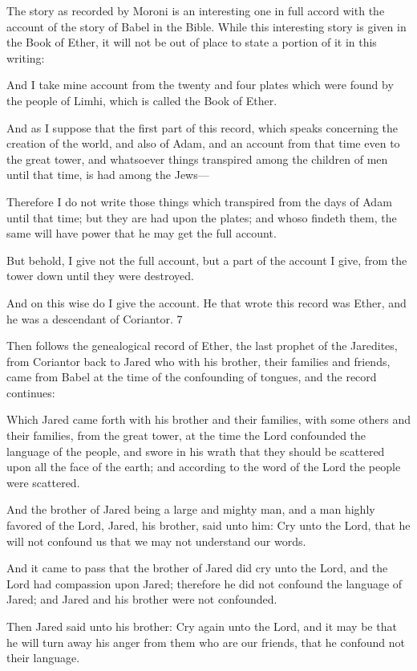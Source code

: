 The story as recorded by Moroni is an interesting one in full accord with the account of the
story of Babel in the Bible. While this interesting story is given in the Book of Ether, it will
not be out of place to state a portion of it in this writing:

And I take mine account from the twenty and four plates which were found by the people of
Limhi, which is called the Book of Ether.

And as I suppose that the first part of this record, which speaks concerning the creation of the
world, and also of Adam, and an account from that time even to the great tower, and
whatsoever things transpired among the children of men until that time, is had among the
Jews—

Therefore I do not write those things which transpired from the days of Adam until that time;
but they are had upon the plates; and whoso findeth them, the same will have power that he
may get the full account.

But behold, I give not the full account, but a part of the account I give, from the tower down
until they were destroyed.

And on this wise do I give the account. He that wrote this record was Ether, and he was a
descendant of Coriantor. 7

Then follows the genealogical record of Ether, the last prophet of the Jaredites, from
Coriantor back to Jared who with his brother, their families and friends, came from Babel at
the time of the confounding of tongues, and the record continues:

Which Jared came forth with his brother and their families, with some others and their
families, from the great tower, at the time the Lord confounded the language of the people,
and swore in his wrath that they should be scattered upon all the face of the earth; and
according to the word of the Lord the people were scattered.

And the brother of Jared being a large and mighty man, and a man highly favored of the
Lord, Jared, his brother, said unto him: Cry unto the Lord, that he will not confound us that
we may not understand our words.

And it came to pass that the brother of Jared did cry unto the Lord, and the Lord had
compassion upon Jared; therefore he did not confound the language of Jared; and Jared and
his brother were not confounded.

Then Jared said unto his brother: Cry again unto the Lord, and it may be that he will turn
away his anger from them who are our friends, that he confound not their language.

